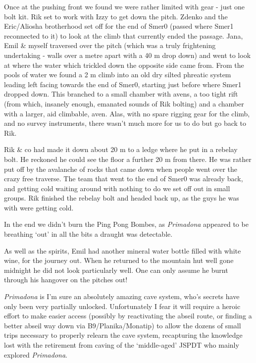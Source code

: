 Once at the pushing front we found we were rather limited with gear -
just one bolt kit. Rik set to work with Izzy to get down the pitch.
Zdenko and the Eric/Aliosha brotherhood set off for the end of Smer0
(passed where Smer1 reconnected to it) to look at the climb that
currently ended the passage. Jana, Emil \& myself traversed over the
pitch (which was a truly frightening undertaking - walls over a metre
apart with a 40 m drop down) and went to look at where the water which
trickled down the opposite side came from. From the pools of water we
found a 2 m climb into an old dry silted phreatic system leading left
facing towards the end of Smer0, starting just before where Smer1
dropped down. This branched to a small chamber with avens, a too tight
rift (from which, insanely enough, emanated sounds of Rik bolting) and a
chamber with a larger, aid climbable, aven. Alas, with no spare rigging
gear for the climb, and no survey instruments, there wasn't much more
for us to do but go back to Rik.

Rik \& co had made it down about 20 m to a ledge where he put in a
rebelay bolt. He reckoned he could see the floor a further 20 m from
there. He was rather put off by the avalanche of rocks that came down
when people went over the crazy free traverse. The team that went to the
end of Smer0 was already back, and getting cold waiting around with
nothing to do we set off out in small groups. Rik finished the rebelay
bolt and headed back up, as the guys he was with were getting cold.

In the end we didn't burn the Ping Pong Bombes, as \emph{Primadona}
appeared to be breathing `out' in all the bits a draught was detectable.

As well as the spirits, Emil had another mineral water bottle filled
with white wine, for the journey out. When he returned to the mountain
hut well gone midnight he did not look particularly well. One can only
assume he burnt through his hangover on the pitches out!

\emph{Primadona} is I'm sure an absolutely amazing cave system, who's
secrets have only been very partially unlocked. Unfortunately I fear it
will require a heroic effort to make easier access (possibly by
reactivating the abseil route, or finding a better abseil way down via
B9/Planika/Monatip) to allow the dozens of small trips necessary to
properly relearn the cave system, recapturing the knowledge lost with
the retirement from caving of the `middle-aged' JSPDT who mainly
explored \emph{Primadona}.

